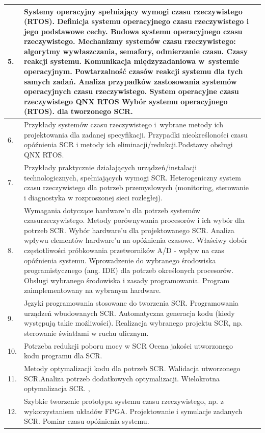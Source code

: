 \documentclass[12pt, a4paper]{article}
\begin{document}
\begin{longtable}{|p{1.5cm}|p{6.5cm}|p{6.5cm}|}
  \hline
  5. & Systemy operacyjny spełniający wymogi czasu rzeczywistego (RTOS).   Definicja systemu operacyjnego czasu rzeczywistego i jego podstawowe cechy. Budowa systemu operacyjnego czasu rzeczywistego. Mechanizmy systemów czasu rzeczywistego: algorytmy wywłaszczania, semafory, odmierzanie czasu. Czasy reakcji systemu. Komunikacja międzyzadaniowa w systemie operacyjnym. Powtarzalność czasów reakcji systemu dla tych samych zadań. Analiza przypadków zastosowania systemów operacyjnych czasu rzeczywistego. System operacyjne czasu rzeczywistego QNX RTOS  Wybór systemu operacyjnego (RTOS).  dla tworzonego SCR. &  \\
  \hline
  6. & Przykłady systemów czasu rzeczywistego i wybrane metody ich projektowania dla zadanej specyfikacji. Przypadki nieokreśloności czasu opóźnienia SCR i metody ich eliminacji/redukcji.Podstawy obsługi QNX RTOS. &  \\
  \hline
  7. & Przykłady praktycznie działających urządzeń/instalacji technologicznych, spełniających wymogi SCR. Heterogeniczny system czasu rzeczywistego dla potrzeb przemysłowych (monitoring, sterowanie i diagnostyka w rozproszonej sieci rozległej). &  \\
  \hline
  8. & Wymagania dotyczące hardware’u dla potrzeb systemów czasurzeczywistego. Metody porównywania procesorów i ich wybór dla potrzeb SCR. Wybór hardware’u dla projektowanego SCR. Analiza wpływu elementów hardware’u na opóźnienia czasowe. Właściwy dobór częstotliwości próbkowania przetworników A/D - wpływ na czas opóźnienia systemu. Wprowadzenie do wybranego środowiska programistycznego (ang. IDE) dla potrzeb określonych procesorów. Obsługi wybranego środowiska i zasady programowania. Program zaimplementowany na wybranym hardware. &  \\
  \hline
  9. & Języki programowania stosowane do tworzenia SCR.  Programowania urządzeń wbudowanych SCR. Automatyczna generacja kodu (kiedy występują takie możliwości). Realizacja wybranego projektu SCR, np. sterowanie światłami w ruchu ulicznym. &  \\
  \hline
  10. & Potrzeba redukcji poboru mocy w SCR Ocena jakości utworzonego kodu programu dla SCR. &  \\
  \hline
  11. & Metody optymalizacji kodu dla potrzeb SCR. Walidacja utworzonego SCR.Analiza potrzeb dodatkowych optymalizacji. Wielokrotna optymalizacja SCR. , &  \\
  \hline
  12. & Szybkie tworzenie prototypu systemu czasu rzeczywistego, np. z wykorzystaniem układów FPGA. Projektowanie i symulacje zadanych SCR. Pomiar czasu opóźnienia systemu. &  \\

\end{longtable}
\end{document}
